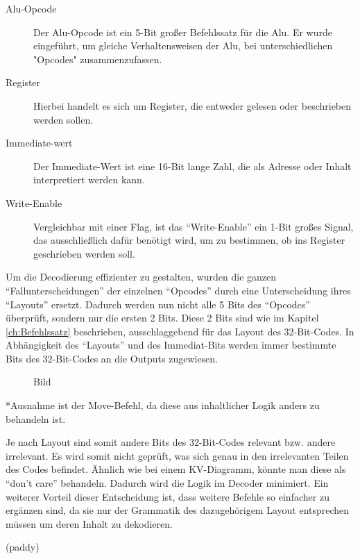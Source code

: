 \documentclass[paper=a4,fontsize=12pt,twocolumn]{scrreprt}
\begin{document}
\begin{description}
 \item [Alu-Opcode]
 Der Alu-Opcode ist ein 5-Bit großer Befehlssatz für die Alu.
 Er wurde eingeführt, um gleiche Verhaltensweisen der Alu, bei unterschiedlichen "Opcodes" zusammenzufassen.

\item [Register]
 Hierbei handelt es sich um Register, die entweder gelesen oder beschrieben werden sollen.

\item [Immediate-wert]
Der Immediate-Wert ist eine 16-Bit lange Zahl, die als Adresse oder Inhalt interpretiert werden kann.

\item [Write-Enable]
 Vergleichbar mit einer Flag, ist das \enquote{Write-Enable} ein 1-Bit großes Signal, das ausschließlich dafür benötigt wird, um zu bestimmen, ob ins Register geschrieben werden soll.
\end{description}

Um die Decodierung effizienter zu gestalten, wurden die ganzen \enquote{Fallunterscheidungen} der einzelnen \enquote{Opcodes} durch eine Unterscheidung ihres \enquote{Layouts} ersetzt.
Dadurch werden nun nicht alle 5 Bits des \enquote{Opcodes} überprüft, sondern nur die ersten 2 Bits.
Diese 2 Bits sind wie im Kapitel \ref{ch:Befehlssatz} beschrieben, ausschlaggebend für das Layout des 32-Bit-Codes.
In Abhängigkeit des \enquote{Layouts} und des Immediat-Bits werden immer bestimmte Bits des 32-Bit-Codes an die Outputs zugewiesen.


\begin{figure}[h]
\centering
\caption{Bild}
\end{figure}

*Ausnahme ist der Move-Befehl, da diese aus inhaltlicher Logik anders zu behandeln ist.

Je nach Layout sind somit andere Bits des 32-Bit-Codes relevant bzw. andere irrelevant. Es wird somit nicht geprüft, was sich genau in den irrelevanten Teilen des Codes befindet. Ähnlich wie bei einem KV-Diagramm, könnte man diese als  \enquote{don't care} behandeln. Dadurch wird die Logik im Decoder minimiert. 
Ein weiterer Vorteil dieser Entscheidung ist, dass weitere Befehle so einfacher zu ergänzen sind, da sie nur der Grammatik des dazugehörigem Layout entsprechen müssen um deren Inhalt zu dekodieren.  


(paddy)
\end{document}

